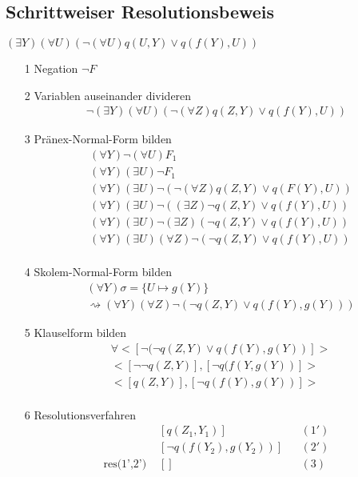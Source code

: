 \subsection{Schrittweiser Resolutionsbeweis}
$(\exists Y)(\forall U)(\neg (\forall U)q(U,Y)\lor q(f(Y),U))$
\begin{itemize}
	\item[1] Negation $\neg F$
	\item[2] Variablen auseinander divideren
	\begin{align*}
		\neg (\exists Y)(\forall U)(\neg (\forall Z)q(Z,Y) \lor q(f(Y),U))
	\end{align*}
	\item[3] Pränex-Normal-Form bilden
	\begin{align*}
		&(\forall Y)\neg (\forall U) F_1\\
		&(\forall Y)(\exists U) \neg F_1\\
		&(\forall Y)(\exists U) \neg(\neg(\forall Z)q(Z,Y) \lor q(F(Y),U))\\
		&(\forall Y)(\exists U) \neg ((\exists Z)\neg q(Z,Y) \lor q(f(Y),U)) \\
		&(\forall Y)(\exists U)\neg(\exists Z)(\neg q(Z,Y) \lor q(f(Y),U)) \\
		&(\forall Y)(\exists U)(\forall Z)\neg(\neg q(Z,Y)\lor q(f(Y),U))\\
	\end{align*}
	\item[4] Skolem-Normal-Form bilden
	\begin{align*}
	&(\forall Y) \sigma = \{U\mapsto g(Y)\}\\
	&\rightsquigarrow (\forall Y)(\forall Z)\neg (\neg q(Z,Y) \lor q(f(Y),g(Y)))
	\end{align*}
	\item[5] Klauselform bilden
	\begin{align*}
	&\forall <[\neg(\neg q(Z,Y) \lor q(f(Y),g(Y))]>\\
	&<[ \neg\neg q(Z,Y)],[\neg q(f(Y,g(Y))]>\\
	&<[q(Z,Y)],[\neg q(f(Y),g(Y))]>\\
	\end{align*}
	\item[6] Resolutionsverfahren
	\begin{align*}
	&[q(Z_1,Y_1)] &&(1')\\
	&[\neg q(f(Y_2),g(Y_2))] &&(2')\\
	\text{res(1',2') }& [] && (3)\\
	\end{align*}
\end{itemize}
